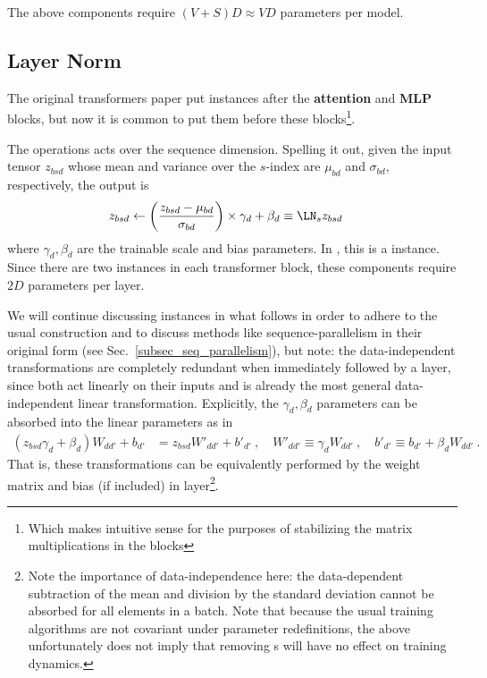 The above components require $ (V+S)D \approx VD $ parameters per model.



\subsection{Layer Norm \label{subsubsec_layer_norm} }

The original transformers paper \cite{vaswani2017attention} put  instances after
the \textbf{attention} and \textbf{MLP} blocks, but now it is common \cite{xiong2020layer} to put
them before these blocks\footnote{Which makes intuitive sense for the purposes of stabilizing the
	matrix multiplications in the blocks}.

The  operations acts over the sequence dimension. Spelling it out, given the
input tensor $ z _{ bsd } $ whose mean and variance over the $ s $-index are $ \mu _{ bd } $ and $
	\sigma _{ bd } $, respectively, the  output is
\begin{align}
	z _{ bsd } & \leftarrow \left ( \frac{ z _{ bsd } - \mu _{ bd } }{ \sigma _{ bd } } \right )\times \gamma _{ d }
	+ \beta _{ d } \equiv \LN _{ s } z _{ bsd}
\end{align}
where $ \gamma _{ d }, \beta  _{ d } $ are the trainable scale and bias parameters. In
, this is a  instance.
Since there are two  instances in each transformer block, these components require
$ 2D $ parameters per layer.

We will continue discussing  instances in what follows in order to adhere to the
usual construction and to discuss methods like sequence-parallelism in their original form (see
Sec.~\ref{subsec_seq_parallelism}), but note: the data-independent 
transformations are completely redundant when immediately followed by a  layer,
since both act linearly on their inputs and  is already the most general
data-independent linear transformation. Explicitly, the  $ \gamma _{ d }, \beta _{ d } $ parameters
can be absorbed into the linear parameters as in
\begin{align}
	\left (     z _{ bsd } \gamma _{ d } + \beta _{ d } \right )  W _{d d'}    + b _{ d' } & = z _{ bsd }
	W' _{ d d' } + b' _{ d' } \ , \quad W' _{ d d' } \equiv  \gamma _{  d} W _{ d d' } \ , \quad b' _{
	d' } \equiv b _{ d' } + \beta _{ d }W _{ d d' } \ .
\end{align}
That is, these transformations can be equivalently performed by the weight matrix and bias (if
included) in  layer\footnote{Note the importance of data-independence here: the
data-dependent subtraction of the mean and division by the standard deviation cannot be absorbed
for all elements in a batch.  Note that because the usual training algorithms are not covariant
under parameter redefinitions, the above unfortunately does not imply that removing
s will have no effect on training dynamics.}.

